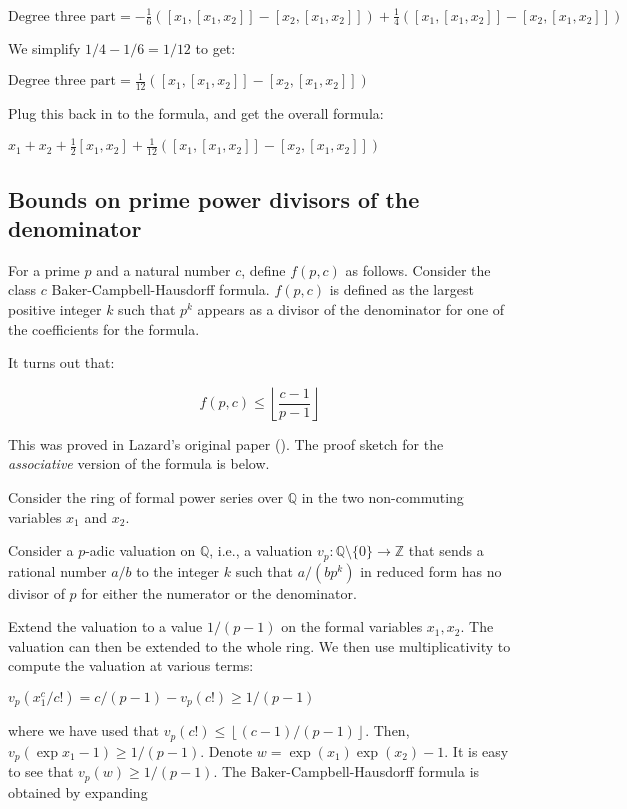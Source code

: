 $\mbox{Degree three part} = - \frac{1}{6}([x_1,[x_1,x_2]] - [x_2,[x_1,x_2]]) + \frac{1}{4}([x_1,[x_1,x_2]] - [x_2,[x_1,x_2]])$

We simplify $1/4 - 1/6 = 1/12$ to get:

$\mbox{Degree three part} = \frac{1}{12}([x_1,[x_1,x_2]] - [x_2,[x_1,x_2]])$

Plug this back in to the formula, and get the overall formula:

$x_1 + x_2 + \frac{1}{2}[x_1,x_2] + \frac{1}{12}([x_1,[x_1,x_2]] - [x_2,[x_1,x_2]])$

\subsection{Bounds on prime power divisors of the denominator}\label{appsec:bch-prime-power-divisor-bound}

For a prime $p$ and a natural number $c$, define $f(p,c)$ as
follows. Consider the class $c$ Baker-Campbell-Hausdorff
formula. $f(p,c)$ is defined as the largest positive integer $k$ such
that $p^k$ appears as a divisor of the denominator for one of the
coefficients for the formula.

It turns out that:

$$f(p,c) \le \left \lfloor \frac{c - 1}{p - 1} \right \rfloor$$

This was proved in Lazard's original paper (\cite{Lazardsoriginal}).
The proof sketch for the
{\em associative} version of the formula is below. %

Consider the ring of formal power series over $\mathbb{Q}$ in the two non-commuting variables $x_1$ and $x_2$.

Consider a $p$-adic valuation on $\mathbb{Q}$, i.e., a valuation $v_p: \mathbb{Q} \setminus \{ 0 \} \to \mathbb{Z}$ that sends a rational number $a/b$ to the integer $k$ such that $a/(bp^k)$ in reduced form has no divisor of $p$ for either the numerator or the denominator.

Extend the valuation to a value $1/(p-1)$ on the formal variables $x_1,x_2$. The valuation can then be extended to the whole ring. We then use multiplicativity to compute the valuation at various terms:

$\! v_p(x_1^c/c!)=c/(p-1) - v_p(c!) \geq 1/(p-1)$

where we have used that $v_p(c!) \leq
\left \lfloor(c-1)/(p-1)\right\rfloor$. Then, $v_p(\exp x_1 - 1)\geq
1/(p-1)$. Denote $w = \exp(x_1)\exp(x_2) - 1$. It is easy to see that
$v_p(w) \geq 1/(p-1)$. The Baker-Campbell-Hausdorff formula is
obtained by expanding

